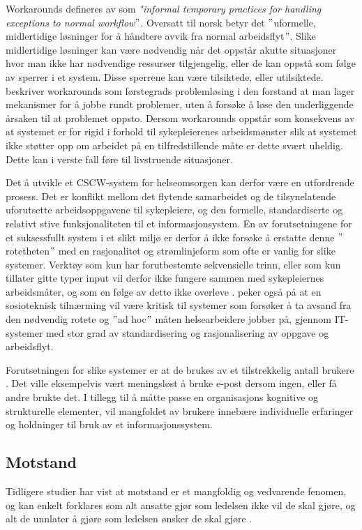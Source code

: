 \noindent
Workarounds defineres av \citet{Kobayashi05} som \emph{"informal temporary practices for handling exceptions to normal workflow$"$}. Oversatt til norsk betyr det $"$uformelle, midlertidige løsninger for å håndtere avvik fra normal arbeidsflyt$"$. Slike midlertidige løsninger kan være nødvendig når det oppstår akutte situasjoner hvor man ikke har nødvendige ressurser tilgjengelig, eller de kan oppstå som følge av sperrer i et system. Disse sperrene kan være tilsiktede, eller utilsiktede. \citet{Vogelsmeier08} beskriver workarounds som førstegrads problemløsing i den forstand at man lager mekanismer for å jobbe rundt problemer, uten å forsøke å løse den underliggende årsaken til at problemet oppsto. Dersom workarounds oppstår som konsekvens av at systemet er for rigid i forhold til sykepleierenes arbeidsmønster slik at systemet ikke støtter opp om arbeidet på en tilfredstillende måte er dette svært uheldig. Dette kan i verste fall føre til livstruende situasjoner.

\noindent
Det å utvikle et CSCW-system for helseomsorgen kan derfor være en utfordrende prosess. Det er konflikt mellom det flytende samarbeidet og de tilsynelatende uforutsette arbeidsoppgavene til sykepleiere, og den formelle, standardiserte og relativt stive funksjonaliteten til et informasjonsystem. En av forutsetningene for et suksessfullt system i et slikt miljø er derfor å ikke forsøke å erstatte denne $"$rotetheten$"$ med en rasjonalitet og strømlinjeform som ofte er vanlig for slike systemer. Verktøy som kun har forutbestemte sekvensielle trinn, eller som kun tillater gitte typer input vil derfor ikke fungere sammen med sykepleiernes arbeidsmåter, og som en følge av dette ikke overleve \citep{Berg99}. \citet{Berg99} peker også på at en sosioteknisk tilnærming vil være kritisk til systemer som forsøker å ta avsand fra den nødvendig rotete og $"$ad hoc$"$ måten helsearbeidere jobber på, gjennom IT-systemer med stor grad av standardisering og rasjonalisering av oppgave og arbeidsflyt.

\noindent
Forutsetningen for slike systemer er at de brukes av et tilstrekkelig antall brukere \citep{Ackerman00}. Det ville eksempelvis vært meningsløst å bruke e-post dersom ingen, eller få andre brukte det. I tillegg til å måtte passe en organisasjons kognitive og strukturelle elementer, vil mangfoldet av brukere innebære individuelle erfaringer og holdninger til bruk av et informasjonssystem. 

\subsection{Motstand}
\label{sec:motstand}
Tidligere studier har vist at motstand er et mangfoldig og vedvarende fenomen, og kan enkelt forklares som alt ansatte gjør som ledelsen ikke vil de skal gjøre, og alt de unnlater å gjøre som ledelsen ønsker de skal gjøre \citep{Timmons03}.
 

